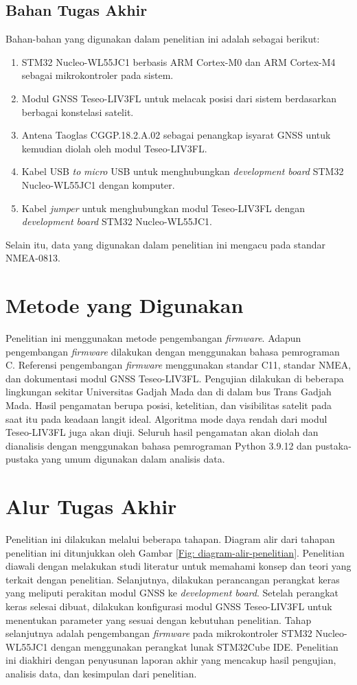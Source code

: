 \subsection{Bahan Tugas Akhir}
Bahan-bahan yang digunakan dalam penelitian ini adalah sebagai berikut:
\begin{enumerate}
	\item STM32 Nucleo-WL55JC1 berbasis ARM Cortex-M0 dan ARM Cortex-M4 sebagai mikrokontroler pada sistem.
	\item Modul GNSS Teseo\hyp{}LIV3FL untuk melacak posisi dari sistem berdasarkan berbagai konstelasi satelit.
	\item Antena Taoglas CGGP.18.2.A.02 sebagai penangkap isyarat GNSS untuk kemudian diolah oleh modul Teseo\hyp{}LIV3FL.
	\item Kabel USB \textit{to} \textit{micro} USB untuk menghubungkan \textit{development board} STM32 Nucleo-WL55JC1 dengan komputer.
	\item Kabel \textit{jumper} untuk menghubungkan modul Teseo\hyp{}LIV3FL dengan \textit{development board} STM32 Nucleo-WL55JC1.
\end{enumerate}
Selain itu, data yang digunakan dalam penelitian ini mengacu pada standar NMEA-0813.

\section{Metode yang Digunakan}
Penelitian ini menggunakan metode pengembangan \textit{firmware}. Adapun pengembangan \textit{firmware} dilakukan dengan menggunakan bahasa pemrograman C. Referensi pengembangan \textit{firmware} menggunakan standar C11, standar NMEA, dan dokumentasi modul GNSS Teseo\hyp{}LIV3FL. Pengujian dilakukan di beberapa lingkungan sekitar Universitas Gadjah Mada dan di dalam bus Trans Gadjah Mada. Hasil pengamatan berupa posisi, ketelitian, dan visibilitas satelit pada saat itu pada keadaan langit ideal. Algoritma mode daya rendah dari modul Teseo\hyp{}LIV3FL juga akan diuji. Seluruh hasil pengamatan akan diolah dan dianalisis dengan menggunakan bahasa pemrograman Python 3.9.12 dan pustaka-pustaka yang umum digunakan dalam analisis data.

\section{Alur Tugas Akhir}
Penelitian ini dilakukan melalui beberapa tahapan. Diagram alir dari tahapan penelitian ini ditunjukkan oleh Gambar \ref{Fig: diagram-alir-penelitian}. Penelitian diawali dengan melakukan studi literatur untuk memahami konsep dan teori yang terkait dengan penelitian. Selanjutnya, dilakukan perancangan perangkat keras yang meliputi perakitan modul GNSS ke \textit{development board}. Setelah perangkat keras selesai dibuat, dilakukan konfigurasi modul GNSS Teseo\hyp{}LIV3FL untuk menentukan parameter yang sesuai dengan kebutuhan penelitian. Tahap selanjutnya adalah pengembangan \textit{firmware} pada mikrokontroler STM32 Nucleo-WL55JC1 dengan menggunakan perangkat lunak STM32Cube IDE. Penelitian ini diakhiri dengan penyusunan laporan akhir yang mencakup hasil pengujian, analisis data, dan kesimpulan dari penelitian.

